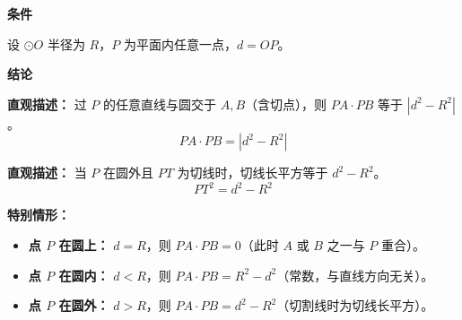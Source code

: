 \begin{statementbox}
	\textbf{\textcolor{CStatement}{条件}}
	\begin{description}[style=nextline, leftmargin=2.8em, labelsep=0.5em, itemsep=0.35em]
		\item[\textbf{\textcolor{CStatement}{条件1（定圆和点）：}}] 设 $\odot O$ 半径为 $R$，$P$ 为平面内任意一点，$d=OP$。
	\end{description}

	\textbf{\textcolor{CStatement}{结论}}
	\begin{description}[style=nextline, leftmargin=2.8em, labelsep=0.5em, itemsep=0.45em]
		\item[\textbf{\textcolor{CStatement}{结论一（圆幂公式）：}}]
			\textbf{\textcolor{CStatement}{直观描述：}}
			过 $P$ 的任意直线与圆交于 $A,B$（含切点），则 $PA\cdot PB$ 等于 $|d^{2}-R^{2}|$。
			\[
				\boxed{PA\cdot PB = |d^{2} - R^{2}|}
			\]

		\item[\textbf{\textcolor{CStatement}{推广结论（切割线定理）：}}]
			\textbf{\textcolor{CStatement}{直观描述：}}
			当 $P$ 在圆外且 $PT$ 为切线时，切线长平方等于 $d^{2}-R^{2}$。
			\[
				PT^{2} = d^{2} - R^{2}
			\]
	\end{description}

	\textbf{\textcolor{CStatement}{特别情形：}}
	\begin{itemize}[leftmargin=*, itemsep=0.5em, topsep=0.4em]
		\item \textbf{点 $P$ 在圆上：} $d=R$，则 $PA\cdot PB = 0$（此时 $A$ 或 $B$ 之一与 $P$ 重合）。
		\item \textbf{点 $P$ 在圆内：} $d<R$，则 $PA\cdot PB = R^{2}-d^{2}$（常数，与直线方向无关）。
		\item \textbf{点 $P$ 在圆外：} $d>R$，则 $PA\cdot PB = d^{2}-R^{2}$（切割线时为切线长平方）。
	\end{itemize}
\end{statementbox}

